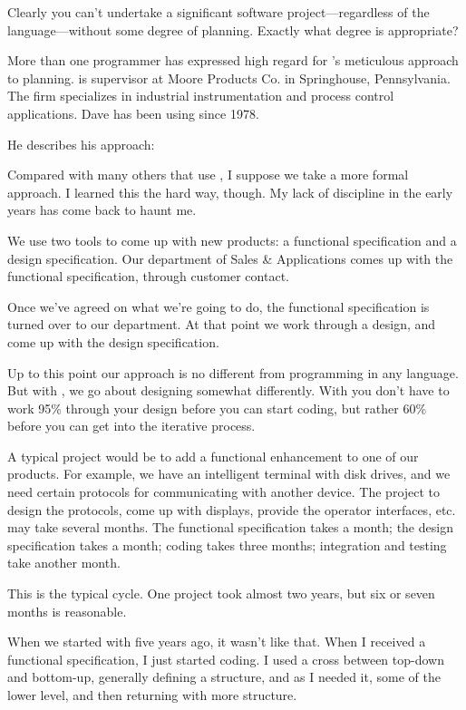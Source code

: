 Clearly you can't undertake a significant software
project---regardless of the language---without some degree of planning.
Exactly what degree is appropriate?%
\begin{interview}
\noindent More than one \Forth{} programmer has expressed high regard for
's meticulous approach to planning.  is supervisor at
Moore Products Co. in Springhouse, Pennsylvania. The firm specializes
in industrial instrumentation and process control applications. Dave has
been using \Forth{} since 1978.

He describes his approach:
\begin{tfquot}
Compared with many others that use \Forth{}, I suppose we take a more
formal approach. I learned this the hard way, though. My lack of
discipline in the early years has come back to haunt me.

We use two tools to come up with new products: a functional specification
and a design specification. Our department of Sales \& Applications comes
up with the functional specification, through customer contact.

Once we've agreed on what we're going to do, the functional
specification is turned over to our department. At that point we work
through a design, and come up with the design specification.

Up to this point our approach is no different from programming in any
language. But with \Forth{}, we go about designing somewhat
differently.  With \Forth{} you don't have to work 95\% through your
design before you can start coding, but rather 60\% before you can get
into the iterative process.


A typical project would be to add a functional enhancement to one of
our products. For example, we have an intelligent terminal with disk
drives, and we need certain protocols for communicating with another
device. The project to design the protocols, come up with displays,
provide the operator interfaces, etc. may take several months. The
functional specification takes a month; the design specification takes
a month; coding takes three months; integration and testing take
another month.

This is the typical cycle. One project took almost two years, but six
or seven months is reasonable.

When we started with \Forth{} five years ago, it wasn't like that. When I
received a functional specification, I just started coding. I used a
cross between top-down and bottom-up, generally defining a structure,
and as I needed it, some of the lower level, and then returning with
more structure.


\end{tfquot}
\end{interview}
